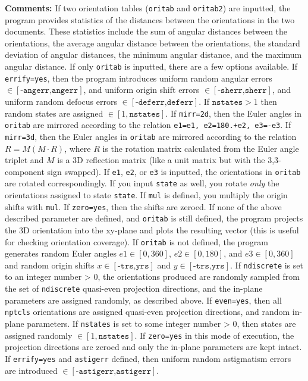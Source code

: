 \documentclass[review]{elsarticle}
\begin{document}
{{\noindent\textbf{Comments:} If two orientation tables (\texttt{oritab} and \texttt{oritab2}) are inputted, the program provides statistics of the distances between the orientations in the two documents. These statistics include the sum of angular distances between the orientations, the average angular distance between the orientations, the standard deviation of angular distances, the minimum angular distance, and the maximum angular distance. If only \texttt{oritab} is inputted, there are a few options available. If \texttt{errify=yes}, then the program introduces uniform random angular errors $\in{[\texttt{-angerr,angerr}]}$, and uniform origin shift errors $\in{[\texttt{-sherr,sherr}]}$, and uniform random defocus errors $\in{[\texttt{-deferr,deferr}]}$. If $\texttt{nstates}>1$ then random states are assigned $\in{[1,\texttt{nstates}]}$. If \texttt{mirr=2d}, then the Euler angles in \texttt{oritab} are mirrored according to the relation \texttt{e1=e1, e2=180.+e2, e3=-e3}. If \texttt{mirr=3d}, then the Euler angles in \texttt{oritab} are mirrored according to the relation $R=M(M\cdot{}R)$, where $R$ is the rotation matrix calculated from the Euler angle triplet and $M$ is a 3D reflection matrix (like a unit matrix but with the 3,3-component sign swapped). If \texttt{e1}, \texttt{e2}, or \texttt{e3} is inputted, the orientations in \texttt{oritab} are rotated correspondingly. If you input \texttt{state} as well, you rotate \textit{only} the orientations assigned to state \texttt{state}. If \texttt{mul} is defined, you multiply the origin shifts with \texttt{mul}. If \texttt{zero=yes}, then the shifts are zeroed. If none of the above described parameter are defined, and \texttt{oritab} is still defined, the program projects the 3D orientation into the xy-plane and plots the resulting vector (this is useful for checking orientation coverage). If \texttt{oritab} is not defined, the program generates random Euler angles $e1\in{[0,360]}$, $e2\in{[0,180]}$, and $e3\in{[0,360]}$ and random origin shifts $x\in{[\texttt{-trs,yrs}]}$ and $y\in{[\texttt{-trs,yrs}]}$. If \texttt{ndiscrete} is set to an integer number > 0, the orientations produced are randomly sampled from the set of \texttt{ndiscrete} quasi-even projection directions, and the in-plane parameters are assigned randomly, as described above. If \texttt{even=yes}, then all \texttt{nptcls} orientations are assigned quasi-even projection directions, and random in-plane parameters. If \texttt{nstates} is set to some integer number > 0, then states are assigned randomly $\in{[1,\texttt{nstates}]}$. If \texttt{zero=yes} in this mode of execution, the projection directions are zeroed and only the in-plane parameters are kept intact. If \texttt{errify=yes} and \texttt{astigerr} defined, then uniform random astigmatism errors are introduced $\in{[\texttt{-astigerr,astigerr}]}$.

}}
\end{document}

